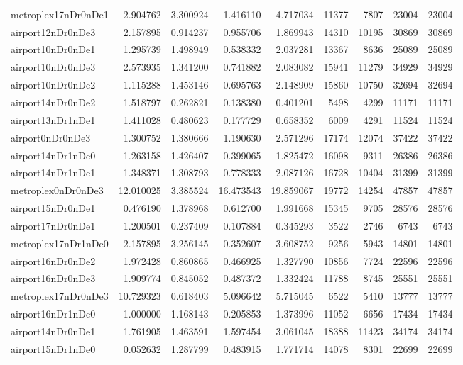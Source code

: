 \begin{longtable}{|l|r|r|r|r|r|r|r|r|}
metroplex17nDr0nDe1 & 2.904762 & 3.300924 & 1.416110 & 4.717034 & 11377 & 7807 & 23004 & 23004 \\
airport12nDr0nDe3 & 2.157895 & 0.914237 & 0.955706 & 1.869943 & 14310 & 10195 & 30869 & 30869 \\
airport10nDr0nDe1 & 1.295739 & 1.498949 & 0.538332 & 2.037281 & 13367 & 8636 & 25089 & 25089 \\
airport10nDr0nDe3 & 2.573935 & 1.341200 & 0.741882 & 2.083082 & 15941 & 11279 & 34929 & 34929 \\
airport10nDr0nDe2 & 1.115288 & 1.453146 & 0.695763 & 2.148909 & 15860 & 10750 & 32694 & 32694 \\
airport14nDr0nDe2 & 1.518797 & 0.262821 & 0.138380 & 0.401201 & 5498 & 4299 & 11171 & 11171 \\
airport13nDr1nDe1 & 1.411028 & 0.480623 & 0.177729 & 0.658352 & 6009 & 4291 & 11524 & 11524 \\
airport0nDr0nDe3 & 1.300752 & 1.380666 & 1.190630 & 2.571296 & 17174 & 12074 & 37422 & 37422 \\
airport14nDr1nDe0 & 1.263158 & 1.426407 & 0.399065 & 1.825472 & 16098 & 9311 & 26386 & 26386 \\
airport14nDr1nDe1 & 1.348371 & 1.308793 & 0.778333 & 2.087126 & 16728 & 10404 & 31399 & 31399 \\
metroplex0nDr0nDe3 & 12.010025 & 3.385524 & 16.473543 & 19.859067 & 19772 & 14254 & 47857 & 47857 \\
airport15nDr0nDe1 & 0.476190 & 1.378968 & 0.612700 & 1.991668 & 15345 & 9705 & 28576 & 28576 \\
airport17nDr0nDe1 & 1.200501 & 0.237409 & 0.107884 & 0.345293 & 3522 & 2746 & 6743 & 6743 \\
metroplex17nDr1nDe0 & 2.157895 & 3.256145 & 0.352607 & 3.608752 & 9256 & 5943 & 14801 & 14801 \\
airport16nDr0nDe2 & 1.972428 & 0.860865 & 0.466925 & 1.327790 & 10856 & 7724 & 22596 & 22596 \\
airport16nDr0nDe3 & 1.909774 & 0.845052 & 0.487372 & 1.332424 & 11788 & 8745 & 25551 & 25551 \\
metroplex17nDr0nDe3 & 10.729323 & 0.618403 & 5.096642 & 5.715045 & 6522 & 5410 & 13777 & 13777 \\
airport16nDr1nDe0 & 1.000000 & 1.168143 & 0.205853 & 1.373996 & 11052 & 6656 & 17434 & 17434 \\
airport14nDr0nDe1 & 1.761905 & 1.463591 & 1.597454 & 3.061045 & 18388 & 11423 & 34174 & 34174 \\
airport15nDr1nDe0 & 0.052632 & 1.287799 & 0.483915 & 1.771714 & 14078 & 8301 & 22699 & 22699 \\

\end{longtable}

